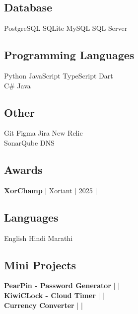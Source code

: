 \documentclass[]{deedy-resume-reversed}
\begin{document}
\begin{minipage}[t]{0.33\textwidth}
\subsection{Database}
PostgreSQL \textbullet SQLite \textbullet MySQL \textbullet SQL Server \\
\sectionsep

\subsection{Programming Languages}
Python \textbullet JavaScript \textbullet TypeScript \textbullet Dart\\ 
C\# \textbullet Java 
\sectionsep

\subsection{Other}
Git \textbullet Figma \textbullet Jira \textbullet New Relic\\
SonarQube \textbullet DNS \\
\sectionsep

\subsection{Awards}
\textbf{XorChamp} | Xoriant | 2025  | 
\href{https://github.com/sunnydodti/resume/blob/main/awards/XorChamp%20-%20Sunny%20Dodti.pdf}{\faExternalLink } 
\sectionsep

\subsection{Languages}
English \textbullet Hindi \textbullet Marathi \\
\sectionsep

\subsection{Mini Projects}

\textbf{PearPin - Password Generator} | \href{https://github.com/sunnydodti/pearpin}{\faGithub} | \href{https://pearpin.persist.site}{\faExternalLink} \\

\textbf{KiwiCLock - Cloud Timer} | \href{https://github.com/sunnydodti/kiwiclock}{\faGithub} | \href{https://kiwiclock.persist.site}{\faExternalLink} \\

\textbf{Currency Converter} | \href{https://github.com/sunnydodti/currency_converter}{\faGithub} | \href{https://sunnydodti.github.io/currency_converter}{\faExternalLink}
\sectionsep

\end{minipage}
\end{document}
